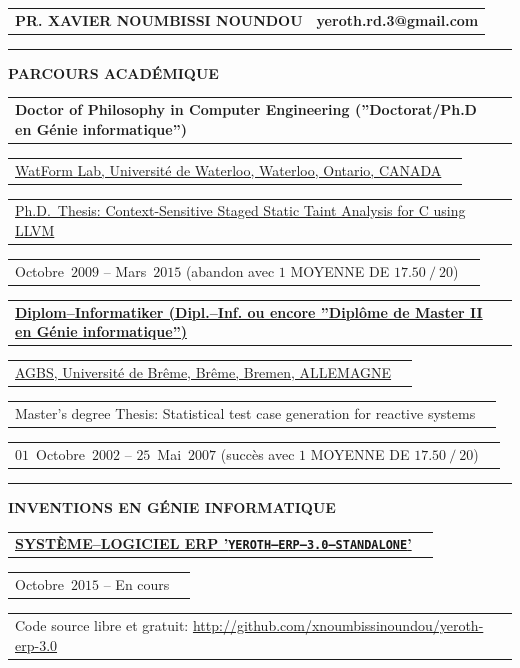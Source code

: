 \documentclass[9pt,a4paper]{article} %
\makeatletter
\newcommand{\myfullacademicname}{PR. XAVIER NOUMBISSI NOUNDOU\xspace}
\newcommand{\headerrow}[2]
{\begin{tabular*}{\linewidth}{l@{\extracolsep{\fill}}r}
	#1 &
	#2 \\
\end{tabular*}}
\newcommand{\headerrowONE}[1]{\headerrow{#1}{}}
\newcommand{\cvitemdate}[2]{#1~$#2$\xspace}
\makeatother
\begin{document}
\thispagestyle{OnlyFirstPage}

\bigskip


\headerrow{\Large \textbf{\myfullacademicname}}
{\Large \textbf{yeroth.rd.3@gmail.com}}

\vspace{1em}


\hrule
\begin{center}
{\large \textbf{PARCOURS ACADÉMIQUE}}
\end{center}

\vspace{0.5em}

\headerrowONE{\textbf{Doctor of Philosophy in Computer Engineering (''Doctorat/Ph.D en Génie informatique'')}}	
\headerrowONE{\href{http://watform.uwaterloo.ca/}{WatForm Lab, Université de Waterloo, Waterloo, Ontario, CANADA}}
\headerrowONE{\href{http://archive.org/details/yeroth-saint}{Ph.D.~Thesis: Context-Sensitive Staged Static Taint Analysis for C using LLVM}}
\headerrowONE{\cvitemdate{Octobre}{2009} -- \cvitemdate{Mars}{2015} (abandon avec $1$ MOYENNE DE $17.50~/~20$)}	
	
\vspace{0.3em}
	
\headerrowONE{\href{http://www.informatik.uni-bremen.de/agbs/qualifikationsarbeiten/diplomarbeiten_e.html}{\textbf{Diplom--Informatiker (Dipl.--Inf. ou encore ''Diplôme de Master II en Génie informatique'')}}}
\headerrowONE{\href{http://www.informatik.uni-bremen.de/agbs/}{AGBS, Université de Brême, Brême, Bremen, ALLEMAGNE}}	
\headerrowONE{Master's degree Thesis: Statistical test case generation for reactive systems}
\headerrowONE{\cvitemdate{$01$~Octobre}{2002} -- \cvitemdate{$25$~Mai}{2007} (succès avec $1$ MOYENNE DE $17.50~/~20$)}	

\vspace{1em}

\hrule
\begin{center}
{\large \textbf{INVENTIONS EN GÉNIE INFORMATIQUE}}
\end{center}

\vspace{0.5em}

\headerrowONE{\href{http://archive.org/details/yeroth-erp-3-0-info-francais}{\textbf{SYSTÈME--LOGICIEL ERP '\texttt{YEROTH--ERP--3.0--STANDALONE}'}}}		
\headerrowONE{\cvitemdate{Octobre}{2015} -- En cours}
\headerrowONE{Code source libre et gratuit: \url{http://github.com/xnoumbissinoundou/yeroth-erp-3.0}}
\end{document}
